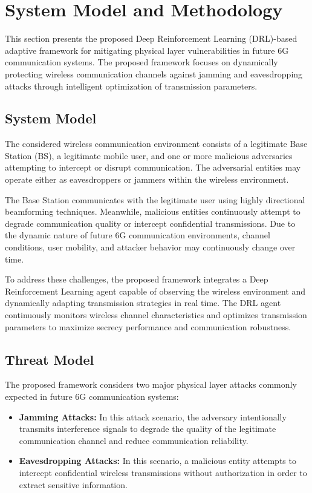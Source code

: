 \documentclass[conference]{IEEEtran}
\begin{document}
\section{System Model and Methodology}

This section presents the proposed Deep Reinforcement Learning (DRL)-based adaptive framework for mitigating physical layer vulnerabilities in future 6G communication systems. The proposed framework focuses on dynamically protecting wireless communication channels against jamming and eavesdropping attacks through intelligent optimization of transmission parameters.

\subsection{System Model}

The considered wireless communication environment consists of a legitimate Base Station (BS), a legitimate mobile user, and one or more malicious adversaries attempting to intercept or disrupt communication. The adversarial entities may operate either as eavesdroppers or jammers within the wireless environment.

The Base Station communicates with the legitimate user using highly directional beamforming techniques. Meanwhile, malicious entities continuously attempt to degrade communication quality or intercept confidential transmissions. Due to the dynamic nature of future 6G communication environments, channel conditions, user mobility, and attacker behavior may continuously change over time.

To address these challenges, the proposed framework integrates a Deep Reinforcement Learning agent capable of observing the wireless environment and dynamically adapting transmission strategies in real time. The DRL agent continuously monitors wireless channel characteristics and optimizes transmission parameters to maximize secrecy performance and communication robustness.

\subsection{Threat Model}

The proposed framework considers two major physical layer attacks commonly expected in future 6G communication systems:

\begin{itemize}

\item \textbf{Jamming Attacks:} In this attack scenario, the adversary intentionally transmits interference signals to degrade the quality of the legitimate communication channel and reduce communication reliability.

\item \textbf{Eavesdropping Attacks:} In this scenario, a malicious entity attempts to intercept confidential wireless transmissions without authorization in order to extract sensitive information.

\end{itemize}
\end{document}
